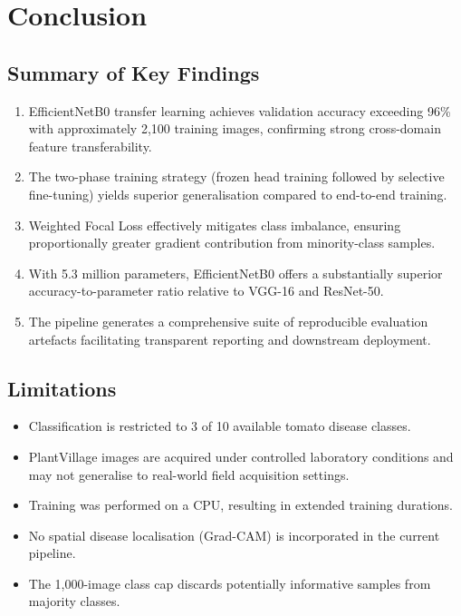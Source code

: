 \documentclass[12pt, a4paper, onecolumn]{IEEEtran}
\begin{document}
\section{Conclusion}

\subsection{Summary of Key Findings}

\begin{enumerate}[leftmargin=1.6em, label=\arabic*)]
  \item EfficientNetB0 transfer learning achieves validation accuracy exceeding 96\% with
        approximately 2,100 training images, confirming strong cross-domain feature transferability.
  \item The two-phase training strategy (frozen head training followed by selective fine-tuning)
        yields superior generalisation compared to end-to-end training.
  \item Weighted Focal Loss effectively mitigates class imbalance, ensuring proportionally greater
        gradient contribution from minority-class samples.
  \item With 5.3 million parameters, EfficientNetB0 offers a substantially superior
        accuracy-to-parameter ratio relative to VGG-16 and ResNet-50.
  \item The pipeline generates a comprehensive suite of reproducible evaluation artefacts
        facilitating transparent reporting and downstream deployment.
\end{enumerate}

\subsection{Limitations}

\begin{itemize}[leftmargin=1.6em, noitemsep]
  \item Classification is restricted to 3 of 10 available tomato disease classes.
  \item PlantVillage images are acquired under controlled laboratory conditions and may not
        generalise to real-world field acquisition settings.
  \item Training was performed on a CPU, resulting in extended training durations.
  \item No spatial disease localisation (Grad-CAM) is incorporated in the current pipeline.
  \item The 1,000-image class cap discards potentially informative samples from majority classes.
\end{itemize}
\end{document}
